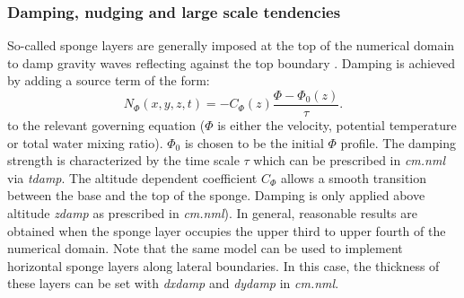 \documentclass[12pt,A4,french]{article}
\begin{document}

\subsubsection{Damping, nudging and large scale tendencies}
\label{nudging}

So-called sponge layers are generally imposed at the top of the numerical domain to damp gravity waves reflecting against the top boundary \cite{Dur2010}. Damping is achieved by adding a source term of the form:
\begin{equation}
N_{\Phi}\left(x,y,z,t\right) = -C_\Phi \left(z\right)\frac{\Phi - \Phi_{0}\left(z\right)}{\tau}. \label{nudg}
\end{equation}
to the relevant governing equation ($\Phi$ is either the velocity, potential temperature or total water mixing ratio). $\Phi_0$ is chosen to be the initial $\Phi$ profile. The damping strength is characterized by the time scale $\tau$ which can be prescribed in {\it cm.nml} via {\it tdamp}. The altitude dependent coefficient $C_\Phi$ allows a smooth transition between the base and the top of the sponge. Damping is only applied above altitude {\it zdamp} as prescribed in {\it cm.nml}). In general, reasonable results are obtained when the sponge layer occupies the upper third to upper fourth of the numerical domain. Note that the same model can be used to implement horizontal sponge layers along lateral boundaries. In this case, the thickness of these layers can be set with {\it dxdamp} and {\it dydamp} in {\it cm.nml}.
\end{document}
